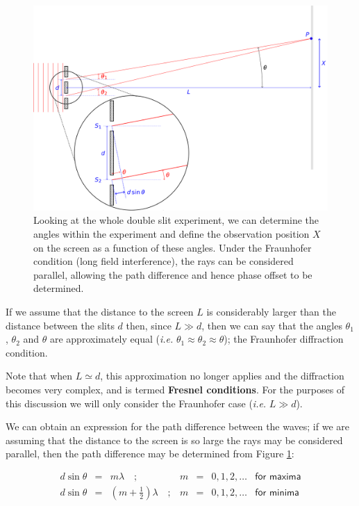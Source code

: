 \documentclass[
]{book}
\begin{document}
\begin{figure}

{\centering \includegraphics[width=0.7\linewidth]{visualisations/LaTeX/ch13-doubleslits2} 

}

\caption{Looking at the whole double slit experiment, we can determine the angles within the experiment and define the observation position $X$ on the screen as a function of these angles. Under the Fraunhofer condition (long field interference), the rays can be considered parallel, allowing the path difference and hence phase offset to be determined.}\label{fig:ch13-doubleslit2}
\end{figure}

If we assume that the distance to the screen \(L\) is considerably larger than the distance between the slits \(d\) then, since \(L \gg d\), then we can say that the angles \(\theta_1\), \(\theta_2\) and \(\theta\) are approximately equal (\emph{i.e.} \(\theta_1 \approx \theta_2 \approx \theta\)); the Fraunhofer diffraction condition.

Note that when \(L \simeq d\), this approximation no longer applies and the diffraction becomes very complex, and is termed \textbf{Fresnel conditions}. For the purposes of this discussion we will only consider the Fraunhofer case (\emph{i.e.} \(L \gg d\)).

We can obtain an expression for the path difference between the waves; if we are assuming that the distance to the screen is so large the rays may be considered parallel, then the path difference may be determined from Figure \ref{fig:ch13-doubleslit2}:

\begin{equation}
\begin{array}{rclrcll}
d\sin\theta &=& m\lambda \quad; & m &=& 0,1,2, \dots &\textsf{for maxima} \\
d\sin\theta &=& \left(m + \frac{1}{2}\right) \lambda \quad; & m &=& 0,1,2, \dots &\textsf{for minima}
\end{array}
\end{equation}
\end{document}
